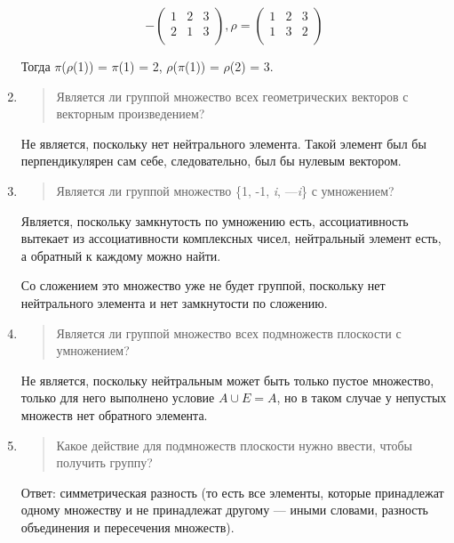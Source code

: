 \documentclass[12pt]{article}
\begin{document}
\begin{enumerate}
              \[- \begin{pmatrix}
                      1 & 2 & 3 \\
                      2 & 1 & 3 \\
                  \end{pmatrix},\rho = (\begin{matrix}
                      1 & 2 & 3 \\
                      1 & 3 & 2 \\
                  \end{matrix})\]

              Тогда $\pi$($\rho$(1)) = $\pi$(1) = 2, $\rho$($\pi$(1)) = $\rho$(2) = 3.

        \item
              \begin{quote}
                  Является ли группой множество всех геометрических векторов с векторным
                  произведением?
              \end{quote}

              Не является, поскольку нет нейтрального элемента. Такой элемент был бы
              перпендикулярен сам себе, следовательно, был бы нулевым вектором.

        \item
              \begin{quote}
                  Является ли группой множество \{1, -1, \emph{i}, ---\emph{i}\} с
                  умножением?
              \end{quote}

              Является, поскольку замкнутость по умножению есть, ассоциативность
              вытекает из ассоциативности комплексных чисел, нейтральный элемент есть,
              а обратный к каждому можно найти.

              Со сложением это множество уже не будет группой, поскольку нет
              нейтрального элемента и нет замкнутости по сложению.

        \item
              \begin{quote}
                  Является ли группой множество всех подмножеств плоскости с умножением?
              \end{quote}

              Не является, поскольку нейтральным может быть только пустое множество,
              только для него выполнено условие $A \cup E = A$, но в таком случае у
              непустых множеств нет обратного элемента.

        \item
              \begin{quote}
                  Какое действие для подмножеств плоскости нужно ввести, чтобы получить
                  группу?
              \end{quote}

              Ответ: симметрическая разность (то есть все элементы, которые
              принадлежат одному множеству и не принадлежат другому --- иными словами,
              разность объединения и пересечения множеств).
    \end{enumerate}
\end{document}
